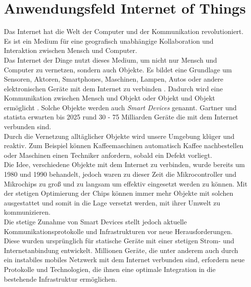 \section{Anwendungsfeld Internet of Things} \label{s:domain}
Das Internet hat die Welt der Computer und der Kommunikation revolutioniert. Es ist ein Medium für eine geografisch unabhängige Kollaboration und Interaktion zwischen Mensch und Computer.
\cite{BriefHistoryInternet}
\\
Das Internet der Dinge nutzt dieses Medium, um nicht nur Mensch und Computer zu vernetzen, sondern auch Objekte.
Es bildet eine Grundlage um Sensoren, Aktoren, Smartphones, Maschinen, Lampen, Autos oder andere elektronischen Geräte mit dem Internet zu verbinden \cite{morganSimpleExplanationInternet}.
Dadurch wird eine Kommunikation zwischen Mensch und Objekt oder Objekt und Objekt ermöglicht \cite{uckelmannArchitectingInternetThings2011}.
Solche Objekte werden auch \textit{Smart Devices} genannt.
Gartner \cite{hungGartnerInsightsHow} und statista \cite{GlobalIoTNonIoT} erwarten bis 2025 rund 30 - 75 Milliarden Geräte die mit dem Internet verbunden sind.
\\
Durch die Vernetzung alltäglicher Objekte wird unsere Umgebung klüger und reaktiv. Zum Beispiel können Kaffeemaschinen automatisch Kaffee nachbestellen oder Maschinen einen Techniker anfordern, sobald ein Defekt vorliegt.
\cite{rangerWhatIoTEverything}
\\
Die Idee, verschiedene Objekte mit dem Internet zu verbinden, wurde bereits um 1980 und 1990 behandelt, jedoch waren zu dieser Zeit die Mikrocontroller und Mikrochips zu gro{\ss} und zu langsam um effektiv eingesetzt werden zu können.
Mit der stetigen Optimierung der Chips können immer mehr Objekte mit solchen ausgestattet und somit in die Lage versetzt werden, mit ihrer Umwelt zu kommunizieren.
\cite{rangerWhatIoTEverything}
\\
Die stetige Zunahme von Smart Devices stellt jedoch aktuelle Kommunikationsprotokolle und Infrastrukturen vor neue Herausforderungen.
Diese wurden ursprünglich für statische Geräte mit einer stetigen Strom- und Internetanbindung entwickelt. Millionen Geräte, die unter anderem auch durch ein instabiles mobiles Netzwerk mit dem Internet verbunden sind, erfordern neue Protokolle und Technologien, die ihnen eine optimale Integration in die bestehende Infrastruktur ermöglichen.
\cite{uckelmannArchitectingInternetThings2011}
\newpage

\begin{comment}
- Describe the (business) domain of your work. Ask yourself: What does the common reader need to know about the domain in order to understand the results of your work? For example, if you work contributes to the claim handling process of some insurance company, describe the common claim handling process.
- Please refrain from meandering explanations about details that have no relevance for later chapters (just in order to increase your page count).
- The header "Domain / Anwendungsfeld" is supposed to be replaced or extended with some more specific header like: "Domain 'Claim handling'"
\end{comment}
